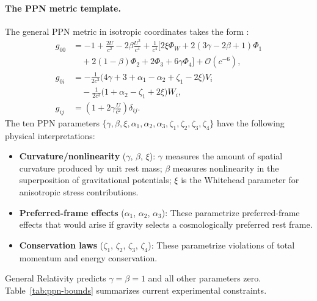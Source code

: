 \paragraph{The PPN metric template.}
The general PPN metric in isotropic coordinates takes the form \cite{Will2018}:
\begin{align}
g_{00} &= -1 + \frac{2U}{c^2} - 2\beta \frac{U^2}{c^4} + \frac{1}{c^4}\Big[2\xi \Phi_W + 2(3\gamma - 2\beta + 1)\Phi_1 \nonumber\\
&\quad + 2(1-\beta)\Phi_2 + 2\Phi_3 + 6\gamma \Phi_4\Big] + \mathcal{O}(c^{-6}), \label{eq:ppn-g00}\\
g_{0i} &= -\frac{1}{2c^3}\Big(4\gamma + 3 + \alpha_1 - \alpha_2 + \zeta_1 - 2\xi\Big)V_i \nonumber\\
&\quad - \frac{1}{2c^3}\Big(1 + \alpha_2 - \zeta_1 + 2\xi\Big)W_i, \label{eq:ppn-g0i}\\
g_{ij} &= \left(1 + 2\gamma \frac{U}{c^2}\right)\delta_{ij}. \label{eq:ppn-gij}
\end{align}
The ten PPN parameters $\{\gamma, \beta, \xi, \alpha_1, \alpha_2, \alpha_3, \zeta_1, \zeta_2, \zeta_3, \zeta_4\}$ have the following physical interpretations:

\begin{itemize}
\item \textbf{Curvature/nonlinearity} ($\gamma$, $\beta$, $\xi$): $\gamma$ measures the amount of spatial curvature produced by unit rest mass; $\beta$ measures nonlinearity in the superposition of gravitational potentials; $\xi$ is the Whitehead parameter for anisotropic stress contributions.

\item \textbf{Preferred-frame effects} ($\alpha_1$, $\alpha_2$, $\alpha_3$): These parametrize preferred-frame effects that would arise if gravity selects a cosmologically preferred rest frame.

\item \textbf{Conservation laws} ($\zeta_1$, $\zeta_2$, $\zeta_3$, $\zeta_4$): These parametrize violations of total momentum and energy conservation.
\end{itemize}

General Relativity predicts $\gamma = \beta = 1$ and all other parameters zero. Table~\ref{tab:ppn-bounds} summarizes current experimental constraints.

